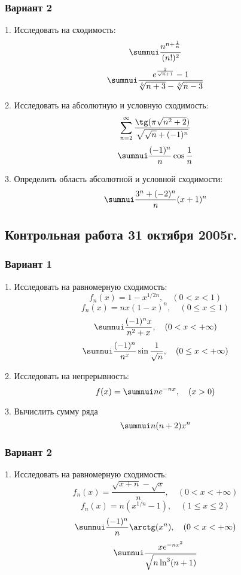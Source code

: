 \documentclass[a4paper]{article}
\begin{document}
\subsubsection{Вариант 2} \setcounter{problem}{0}

1. Исследовать на сходимость:
$$
\sumnui\frac{n^{n+\frac{1}{n}}}{(n!)^2}
$$
$$
\sumnui\frac{e^\frac{2}{\sqrt n+1}-1}{\sqrt[5]{n+3}-\sqrt[5]{n-3}}
$$

2. Исследовать на абсолютную и условную сходимость:
$$
\sum_{n=2}^\infty\frac{\tg(\pi\sqrt{n^2+2})}{\sqrt{\sqrt{n}+(-1)^n}}
$$
$$
\sumnui\frac{(-1)^n}{n}\cos\frac{1}{n}
$$

3. Определить область абсолютной и условной сходимости:
$$
\sumnui\frac{3^n+(-2)^n}{n}(x+1)^n
$$

\subsection{Контрольная работа 31 октября 2005г.}

\subsubsection{Вариант 1}

1. Исследовать на равномерную сходимость:
$$
f_n(x)=1-x^{1/2n},\quad (0<x<1)
$$
$$
f_n(x)=nx(1-x)^n,\quad (0\le x\le 1)
$$
$$
\sumnui \frac{(-1)^nx}{n^2+x},\quad (0<x<+\infty)
$$
$$
\sumnui \frac{(-1)^n}{n^x}\sin\frac{1}{\sqrt n}, \quad (0\le x<
+\infty)
$$

2. Исследовать на непрерывность:
$$
f(x)=\sumnui ne^{-nx}, \quad (x>0)
$$

3. Вычислить сумму ряда
$$
\sumnui n(n+2)x^n
$$

\subsubsection{Вариант 2}

1. Исследовать на равномерную сходимость:
$$
f_n(x)=\frac{\sqrt{x+n}-\sqrt x}{n},\quad (0<x<+\infty)
$$
$$
f_n(x)=n(x^{1/n}-1),\quad (1\le x\le 2)
$$
$$
\sumnui \frac{(-1)^n}{n}\arctg (x^n),\quad (0<x<+\infty)
$$
$$
\sumnui \frac{xe^{-nx^2}}{\sqrt{n\ln^3(n+1)}}
$$
\end{document}
